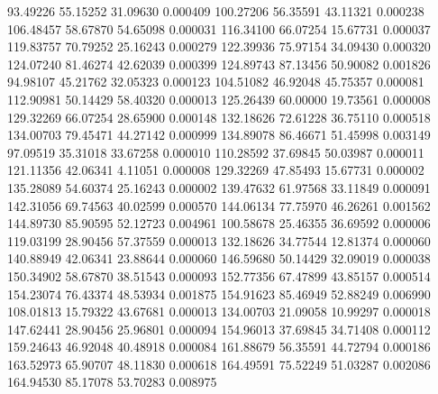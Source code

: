        93.49226       55.15252       31.09630       0.000409
      100.27206       56.35591       43.11321       0.000238
      106.48457       58.67870       54.65098       0.000031
      116.34100       66.07254       15.67731       0.000037
      119.83757       70.79252       25.16243       0.000279
      122.39936       75.97154       34.09430       0.000320
      124.07240       81.46274       42.62039       0.000399
      124.89743       87.13456       50.90082       0.001826
       94.98107       45.21762       32.05323       0.000123
      104.51082       46.92048       45.75357       0.000081
      112.90981       50.14429       58.40320       0.000013
      125.26439       60.00000       19.73561       0.000008
      129.32269       66.07254       28.65900       0.000148
      132.18626       72.61228       36.75110       0.000518
      134.00703       79.45471       44.27142       0.000999
      134.89078       86.46671       51.45998       0.003149
       97.09519       35.31018       33.67258       0.000010
      110.28592       37.69845       50.03987       0.000011
      121.11356       42.06341        4.11051       0.000008
      129.32269       47.85493       15.67731       0.000002
      135.28089       54.60374       25.16243       0.000002
      139.47632       61.97568       33.11849       0.000091
      142.31056       69.74563       40.02599       0.000570
      144.06134       77.75970       46.26261       0.001562
      144.89730       85.90595       52.12723       0.004961
      100.58678       25.46355       36.69592       0.000006
      119.03199       28.90456       57.37559       0.000013
      132.18626       34.77544       12.81374       0.000060
      140.88949       42.06341       23.88644       0.000060
      146.59680       50.14429       32.09019       0.000038
      150.34902       58.67870       38.51543       0.000093
      152.77356       67.47899       43.85157       0.000514
      154.23074       76.43374       48.53934       0.001875
      154.91623       85.46949       52.88249       0.006990
      108.01813       15.79322       43.67681       0.000013
      134.00703       21.09058       10.99297       0.000018
      147.62441       28.90456       25.96801       0.000094
      154.96013       37.69845       34.71408       0.000112
      159.24643       46.92048       40.48918       0.000084
      161.88679       56.35591       44.72794       0.000186
      163.52973       65.90707       48.11830       0.000618
      164.49591       75.52249       51.03287       0.002086
      164.94530       85.17078       53.70283       0.008975
